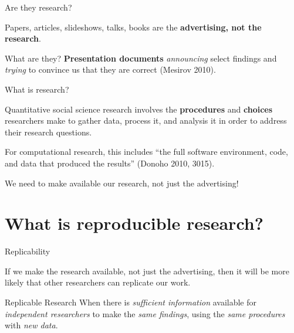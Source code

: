\documentclass[10pt]{beamer}
\begin{document}
\begin{frame}{Are they research?}


    Papers, articles, slideshows, talks, books are the {\large{\textbf{advertising, not the research}}}.

    \vspace{1cm}

    \begin{block}{What are they?}
        \textbf{Presentation documents} \emph{announcing} select findings and \emph{trying} to convince us that they are correct (Mesirov 2010).
    \end{block}
\end{frame}

\begin{frame}{What is research?}

    Quantitative social science research involves the \textbf{procedures} and \textbf{choices} researchers make to gather data, process it, and analysis it in order to address their research questions.

    \vspace{1cm}

    For {\large{computational research}}, this includes ``the {\large{full software environment, code, and data}} that produced the results'' (Donoho 2010, 3015).

\end{frame}

\begin{frame}
    \begin{center}
        {\large{We need to make available our research, not just the advertising!}}
    \end{center}
\end{frame}


\section{What is reproducible research?}

\begin{frame}{Replicability}

    If we make the research available, not just the advertising, then it will be {\large{more likely}} that other researchers can replicate our work.

    \vspace{1cm}

    \begin{exampleblock}{Replicable Research}
        When there is \emph{sufficient information} available for \emph{independent researchers} to make the \emph{same findings}, using the \emph{same procedures} with \emph{new data}.
    \end{exampleblock}

\end{frame}
\end{document}

